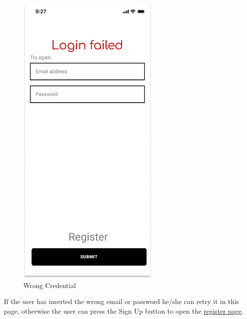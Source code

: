 \begin{figure}[H]
    \centering
    \includegraphics[keepaspectratio, height=15cm]{Mockup/CPOAppInterface/Failed Login.png}
    \caption{Wrong Credential}
    \label{site:FailedLogin}
\end{figure}
If the user has inserted the wrong email or password he/she can retry it in this page, otherwise the user can press the Sign Up button to open the \hyperref[site:Register]{register page}.
